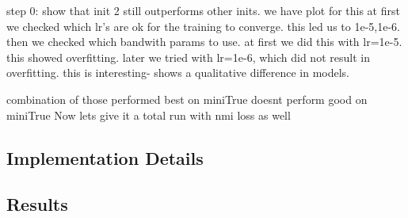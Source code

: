 step 0: show that init 2 still outperforms other inits. we have plot for this
at first we checked which lr's are ok for the training to converge. this led us to 1e-5,1e-6.
then we checked which bandwith params to use. at first we did this with lr=1e-5. this showed overfitting.
later we tried with lr=1e-6, which did not result in overfitting. this is interesting- shows a qualitative difference in models.

combination of those performed best on miniTrue doesnt perform good on miniTrue 
Now lets give it a total run with nmi loss as well
\subsection{Implementation Details}
\subsection{Results}

